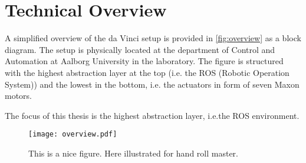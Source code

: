 \section{Technical Overview}
A simplified overview of the da Vinci setup is provided in \autoref{fig:overview} as a block diagram. The setup is physically located at the department of Control and Automation at Aalborg University in the laboratory. The figure is structured with the highest abstraction layer at the top (i.e. the ROS (Robotic Operation System)) and the lowest in the bottom, i.e. the actuators in form of seven Maxon motors.

The focus of this thesis is the highest abstraction layer, i.e.the ROS environment.
\begin{figure}[H]
	\center
	\texttt{[image: overview.pdf]}	\caption{This is a nice figure. Here illustrated for hand roll master.}
	\label{fig:overview}
\end{figure}
